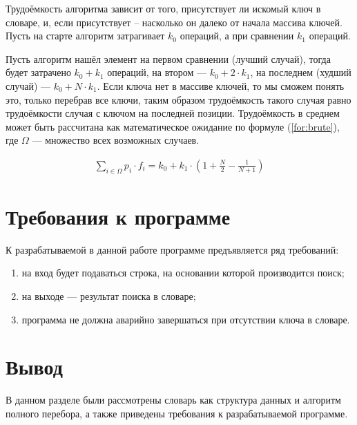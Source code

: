 Трудоёмкость алгоритма зависит от того, присутствует ли искомый ключ в словаре, и, если присутствует -- насколько он далеко от начала массива ключей.
Пусть на старте алгоритм затрагивает $k_{0}$ операций, а при сравнении $k_{1}$ операций.

Пусть алгоритм нашёл элемент на первом сравнении (лучший случай), тогда будет затрачено $k_0 + k_1$ операций, на втором --- $k_0 + 2 \cdot k_1$, на последнем (худший случай) --- $k_0 + N \cdot k_1$. Если ключа нет в массиве ключей, то мы сможем понять это, только перебрав все ключи, таким образом трудоёмкость такого случая равно трудоёмкости случая с ключом на последней позиции. Трудоёмкость в среднем может быть рассчитана как математическое ожидание по формуле (\ref{for:brute}), где $\Omega$ --- множество всех возможных случаев.

\begin{equation}
	\label{for:brute}
	\begin{aligned}
		\sum\limits_{i \in \Omega} p_i \cdot f_i = k_0 + k_1 \cdot \left(1 + \frac{N}{2} - \frac{1}{N + 1}\right)
	\end{aligned}
\end{equation}

\section{Требования к программе}

К разрабатываемой в данной работе программе предъявляется ряд требований:
\begin{enumerate}[label=\arabic*)]
	\item на вход будет подаваться строка, на основании которой производится поиск;
	\item на выходе --- результат поиска в словаре;
	\item программа не должна аварийно завершаться при отсутствии ключа в словаре.
\end{enumerate}

\section{Вывод}

В данном разделе были рассмотрены словарь как структура данных и алгоритм полного перебора, а также приведены требования к разрабатываемой программе.

